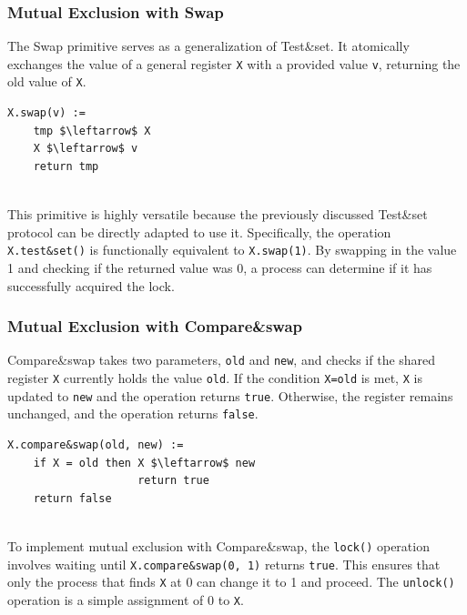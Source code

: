 \subsubsection{Mutual Exclusion with Swap}
The Swap primitive serves as a generalization of Test\&set. It atomically exchanges the value of a general register \texttt{X} with a provided value \texttt{v}, returning the old value of \texttt{X}. 

\begin{minipage}{\textwidth}
\begin{lstlisting}[mathescape]
X.swap(v) :=
    tmp $\leftarrow$ X
    X $\leftarrow$ v
    return tmp
\end{lstlisting}
\end{minipage}\\

This primitive is highly versatile because the previously discussed Test\&set protocol can be directly adapted to use it. Specifically, the operation \texttt{X.test\&set()} is functionally equivalent to \texttt{X.swap(1)}. By swapping in the value 1 and checking if the returned value was 0, a process can determine if it has successfully acquired the lock.

\subsubsection{Mutual Exclusion with Compare\&swap}
Compare\&swap takes two parameters, \texttt{old} and \texttt{new}, and checks if the shared register \texttt{X} currently holds the value \texttt{old}. If the condition \texttt{X=old} is met, \texttt{X} is updated to \texttt{new} and the operation returns \texttt{true}. Otherwise, the register remains unchanged, and the operation returns \texttt{false}.

\begin{minipage}{\textwidth}
\begin{lstlisting}[mathescape]
X.compare&swap(old, new) :=
    if X = old then X $\leftarrow$ new
                    return true
    return false
\end{lstlisting}
\end{minipage}\\

To implement mutual exclusion with Compare\&swap, the \texttt{lock()} operation involves waiting until \texttt{X.compare\&swap(0, 1)} returns \texttt{true}. This ensures that only the process that finds \texttt{X} at 0 can change it to 1 and proceed. The \texttt{unlock()} operation is a simple assignment of 0 to \texttt{X}. 

